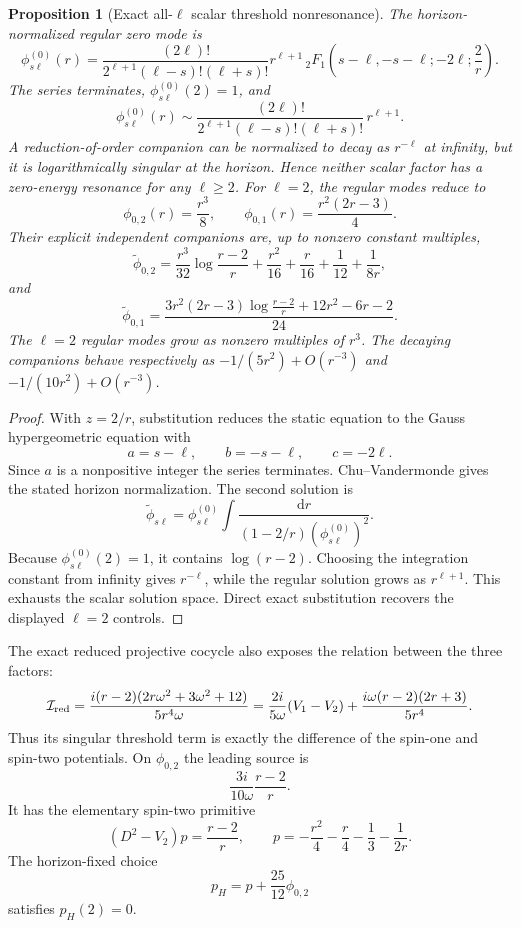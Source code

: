 \documentclass[11pt]{article}
\newtheorem{proposition}[theorem]{Proposition}
\theoremstyle{definition}
\theoremstyle{remark}
\newcommand{\dd}{\mathrm d}
\begin{document}
\begin{proposition}[Exact all-\(\ell\) scalar threshold nonresonance]
\label{prop:threshold}
The horizon-normalized regular zero mode is
\[
\phi_{s\ell}^{(0)}(r)
=
\frac{(2\ell)!}
{2^{\ell+1}(\ell-s)!(\ell+s)!}
r^{\ell+1}\,
{}_2F_1\!\left(
s-\ell,-s-\ell;-2\ell;\frac2r
\right).
\]
The series terminates, \(\phi_{s\ell}^{(0)}(2)=1\), and
\[
\phi_{s\ell}^{(0)}(r)
\sim
\frac{(2\ell)!}
{2^{\ell+1}(\ell-s)!(\ell+s)!}\,r^{\ell+1}.
\]
A reduction-of-order companion can be normalized to decay as \(r^{-\ell}\)
at infinity, but it is logarithmically singular at the horizon.  Hence
neither scalar factor has a zero-energy resonance for any \(\ell\ge2\).
For \(\ell=2\), the regular modes reduce to
\[
\phi_{0,2}(r)=\frac{r^3}{8},\qquad
\phi_{0,1}(r)=\frac{r^2(2r-3)}4.
\]
Their explicit independent companions are, up to nonzero constant multiples,
\[
\widetilde\phi_{0,2}
=
\frac{r^3}{32}\log\frac{r-2}{r}
+\frac{r^2}{16}+\frac r{16}+\frac1{12}+\frac1{8r},
\]
and
\[
\widetilde\phi_{0,1}
=
\frac{
3r^2(2r-3)\log\frac{r-2}{r}
+12r^2-6r-2}{24}.
\]
The \(\ell=2\) regular modes grow as nonzero multiples of \(r^3\).  The decaying
companions behave respectively as
\(-1/(5r^2)+O(r^{-3})\) and
\(-1/(10r^2)+O(r^{-3})\).
\end{proposition}

\begin{proof}
With \(z=2/r\), substitution reduces the static equation to the Gauss
hypergeometric equation with
\[
a=s-\ell,\qquad b=-s-\ell,\qquad c=-2\ell.
\]
Since \(a\) is a nonpositive integer the series terminates.
Chu--Vandermonde gives the stated horizon normalization.  The second
solution is
\[
\widetilde\phi_{s\ell}
=
\phi_{s\ell}^{(0)}
\int
\frac{\dd r}
{(1-2/r)(\phi_{s\ell}^{(0)})^2}.
\]
Because \(\phi_{s\ell}^{(0)}(2)=1\), it contains \(\log(r-2)\).  Choosing
the integration constant from infinity gives \(r^{-\ell}\), while the
regular solution grows as \(r^{\ell+1}\).  This exhausts the scalar solution
space.  Direct exact substitution recovers the displayed \(\ell=2\)
controls.
\end{proof}

The exact reduced projective cocycle also exposes the relation between the
three factors:
\begin{equation}
\label{eq:threshold-cocycle}
\mathcal I_{\rm red}
=
\frac{i(r-2)(2r\omega^2+3\omega^2+12)}{5r^4\omega}
=
\frac{2i}{5\omega}(V_1-V_2)
+\frac{i\omega(r-2)(2r+3)}{5r^4}.
\end{equation}
Thus its singular threshold term is exactly the difference of the spin-one
and spin-two potentials.  On \(\phi_{0,2}\) the leading source is
\[
\frac{3i}{10\omega}\frac{r-2}{r}.
\]
It has the elementary spin-two primitive
\begin{equation}
\label{eq:threshold-primitive}
(D^2-V_2)p=\frac{r-2}{r},\qquad
p=-\frac{r^2}{4}-\frac r4-\frac13-\frac1{2r}.
\end{equation}
The horizon-fixed choice
\[
p_H=p+\frac{25}{12}\phi_{0,2}
\]
satisfies \(p_H(2)=0\).
\end{document}
